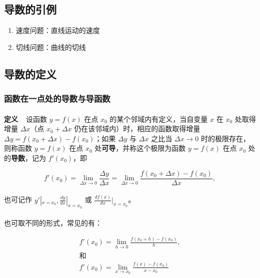 \subsection{导数的引例}
\begin{enumerate}
  \item 速度问题：直线运动的速度
  \item 切线问题：曲线的切线
\end{enumerate}

\subsection{导数的定义}
\subsubsection{函数在一点处的导数与导函数}
\paragraph{}
\textbf{定义~~}设函数 $y = f(x)$ 在点 $x_0$ 的某个邻域内有定义，当自变量 $x$ 在 $x_0$ 处取得增量 $\Delta x$（点 $x_0 + \Delta x$ 仍在该邻域内）时，相应的函数取得增量 $\Delta y = f(x_0 + \Delta x) - f(x_0)$；如果 $\Delta y$ 与 $\Delta x$ 之比当 $\Delta x \to 0$ 时的极限存在，则称函数 $y = f(x)$ 在点 $x_0$ 处\textbf{可导}，并称这个极限为函数 $y = f(x)$ 在点 $x_0$ 处的\textbf{导数}，记为 $f'(x_0)$，即

\begin{equation}
f'(x_0) = \lim_{\Delta x \to 0} \frac{\Delta y}{\Delta x} = \lim_{\Delta x \to 0} \frac{f(x_0 + \Delta x) - f(x_0)}{\Delta x},
\end{equation}

\paragraph{}
也可记作 $y'|_{x = x_0}, \frac{dy}{dx}|_{x = x_0}$ 或 $\frac{df(x)}{dx}|_{x=x_0}$。

\paragraph{}
也可取不同的形式，常见的有：

\begin{gather}
f'(x_0) = \lim_{h \to 0} \frac{f(x_0 + h) - f(x_0)}{h} , \\
\text{和} \\
f'(x_0) = \lim_{x \to x_0}\frac{f(x) - f(x_0)}{x - x_0}
\end{gather}

